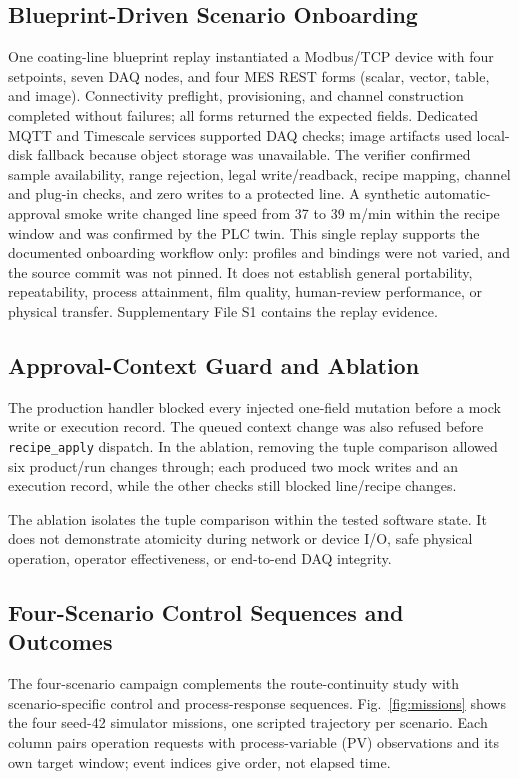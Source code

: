 \subsection{Blueprint-Driven Scenario Onboarding}
\label{sec:coating-onboarding}
One coating-line blueprint replay instantiated a Modbus/TCP device with four setpoints,
seven DAQ nodes, and four MES REST forms (scalar, vector, table, and image).
Connectivity preflight, provisioning, and channel construction completed
without failures; all forms returned the expected fields. Dedicated MQTT and
Timescale services supported DAQ checks; image artifacts used local-disk
fallback because object storage was unavailable. The verifier confirmed sample
availability, range rejection, legal write/readback, recipe mapping, channel
and plug-in checks, and zero writes to a protected line. A synthetic
automatic-approval smoke write changed line speed from 37 to 39 m/min within the
recipe window and was confirmed by the PLC twin. This single replay supports
the documented onboarding workflow only: profiles and bindings were not varied,
and the source commit was not pinned. It does not establish general portability,
repeatability, process attainment, film quality, human-review performance, or
physical transfer. Supplementary File S1 contains the replay evidence.
\subsection{Approval-Context Guard and Ablation}
\label{sec:guard-results}
The production handler blocked every injected one-field mutation before a mock
write or execution record. The queued context change was also refused before
\texttt{recipe\_apply} dispatch. In the ablation, removing the tuple comparison
allowed six product/run changes through; each produced two mock writes and an
execution record, while the other checks still blocked line/recipe changes.

The ablation isolates the tuple comparison within the tested software state.
It does not demonstrate atomicity during network or device I/O, safe physical
operation, operator effectiveness, or end-to-end DAQ integrity.

\subsection{Four-Scenario Control Sequences and Outcomes}
\label{sec:scenario-sequences}
The four-scenario campaign complements the route-continuity study with
scenario-specific control and process-response sequences. Fig.~\ref{fig:missions}
shows the four seed-42 simulator missions, one scripted trajectory per scenario.
Each column pairs operation requests with process-variable (PV) observations
and its own target window; event indices give order, not elapsed time.

